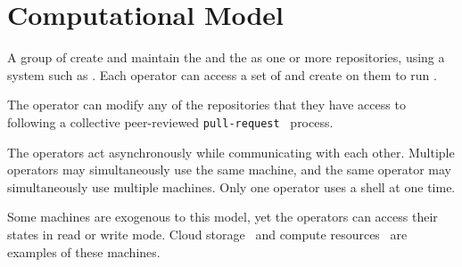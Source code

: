 \section{Computational Model}\label{computation_model}

A group of  create and maintain the  and the  as one or more repositories, using a system such as . Each operator can access a set of  and create  on them to run . 



The operator can modify any of the repositories that they have access to following a collective peer-reviewed \texttt{pull-request}~\cite{pull_request} process.

The operators act asynchronously while communicating with each other. Multiple operators may simultaneously use the same machine, and the same operator may simultaneously use multiple machines. Only one operator uses a shell at one time. 

Some machines are exogenous to this model, yet the operators can access their states in read or write mode. Cloud storage~\cite{aws_s3} and compute resources~\cite{aws_batch} are examples of these machines.

